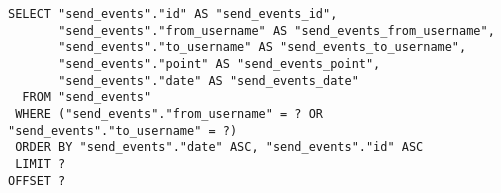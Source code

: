 \documentclass[../../../../main]{subfiles}
\begin{document}
    \begin{mdframed}
        \begin{verbatim}
SELECT "send_events"."id" AS "send_events_id",
       "send_events"."from_username" AS "send_events_from_username",
       "send_events"."to_username" AS "send_events_to_username",
       "send_events"."point" AS "send_events_point",
       "send_events"."date" AS "send_events_date"
  FROM "send_events"
 WHERE ("send_events"."from_username" = ? OR "send_events"."to_username" = ?)
 ORDER BY "send_events"."date" ASC, "send_events"."id" ASC
 LIMIT ?
OFFSET ?
        \end{verbatim}
    \end{mdframed}
    \label{fig:paging-offset-sql}
\end{document}
